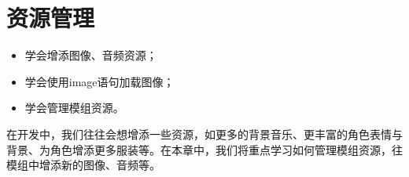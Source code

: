 \chapter{资源管理}
\begin{ChapterGoals}
    \begin{itemize}
        \item 学会增添图像、音频资源；
        \item 学会使用image语句加载图像；
        \item 学会管理模组资源。
    \end{itemize}
\end{ChapterGoals}

在开发中，我们往往会想增添一些资源，如更多的背景音乐、更丰富的角色表情与背景、为角色增添更多服装等。在本章中，我们将重点学习如何管理模组资源，往模组中增添新的图像、音频等。

